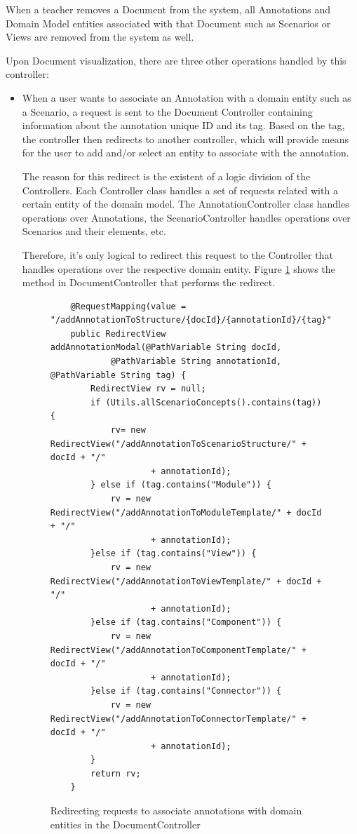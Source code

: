 \documentclass{llncs}
\begin{document}
When a teacher removes a Document from the system, all Annotations and Domain Model entities associated with that Document such as Scenarios or Views are removed from the system as well.

Upon Document visualization, there are three other operations handled by this controller:

\begin{itemize}
\item When a user wants to associate an Annotation with a domain entity such as a Scenario, a request is sent to the Document Controller containing information about the annotation unique ID and its tag. Based on the tag, the controller then redirects to another controller, which will provide means for the user to add and/or select an entity to associate with the annotation.

The reason for this redirect is the existent of a logic division of the Controllers. Each Controller class handles a set of requests related with a certain entity of the domain model. The AnnotationController class handles operations over Annotations, the ScenarioController handles operations over Scenarios and their elements, etc. 

Therefore, it's only logical to redirect this request to the Controller that handles operations over the respective domain entity. Figure \ref{figure:documentControllerLinkAnnotation} shows the method in DocumentController that performs the redirect.

\begin{figure}
\lstset{style=customjava}
\begin{lstlisting}
	@RequestMapping(value = "/addAnnotationToStructure/{docId}/{annotationId}/{tag}")
	public RedirectView addAnnotationModal(@PathVariable String docId,
			@PathVariable String annotationId, @PathVariable String tag) {
		RedirectView rv = null;
		if (Utils.allScenarioConcepts().contains(tag)) {
			rv= new RedirectView("/addAnnotationToScenarioStructure/" + docId + "/"
					+ annotationId);
		} else if (tag.contains("Module")) {
			rv = new RedirectView("/addAnnotationToModuleTemplate/" + docId + "/"
					+ annotationId);
		}else if (tag.contains("View")) {
			rv = new RedirectView("/addAnnotationToViewTemplate/" + docId + "/"
					+ annotationId);
		}else if (tag.contains("Component")) {
			rv = new RedirectView("/addAnnotationToComponentTemplate/" + docId + "/"
					+ annotationId);
		}else if (tag.contains("Connector")) {
			rv = new RedirectView("/addAnnotationToConnectorTemplate/" + docId + "/"
					+ annotationId);
		}
		return rv;
	}	
\end{lstlisting}
\caption{Redirecting requests to associate annotations with domain entities in the DocumentController}
\label{figure:documentControllerLinkAnnotation}
\end{figure}


\end{itemize}
\end{document}
